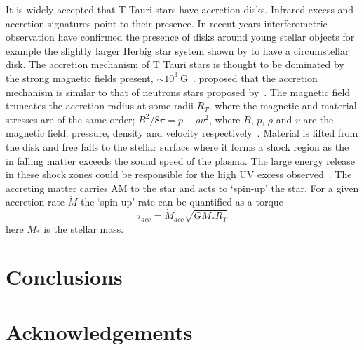 \documentclass[fleqn,usenatbib]{mnras}
\begin{document}
It is widely accepted that T Tauri stars have
accretion disks. Infrared excess and accretion
signatures point to their presence. In recent years
interferometric observation have confirmed the
presence of disks around young stellar objects for
example the slightly larger Herbig star system shown
by \cite{2012ApJ...752...11K} to have a circumstellar
disk. The accretion mechanism of T Tauri stars is
thought to be dominated by the strong magnetic fields
present, $\sim 10^{3}~\textrm{G}$~\citep{2012MNRAS.426.2901K}.
\citet{1991ApJ...370L..39K} proposed that the accretion mechanism is
similar to that of neutrons stars proposed
by~\citet{1977ApJ...217..578G}. The magnetic field truncates the
accretion radius at some radii $R_T$. where the magnetic and material
stresses are of the same order; $B^2/8\pi = p + \rho v^2$, where $B$,
$p$, $\rho$ and $v$ are the magnetic field, pressure, density and
velocity respectively~\citep{Romanova:2002hc}. Material is lifted from
the disk and free falls to the stellar surface where it forms a shock region as the in falling matter exceeds the sound speed of the plasma. The large energy release in these shock zones could be responsible for the high UV excess observed~\citep{2009A&A...508.1117Z}. The accreting matter carries AM to the star and acts to `spin-up' the star. For a given accretion rate $\dot{M}$ the `spin-up' rate can be quantified as a torque~\citep{2005ApJ...632L.135M}
\begin{equation}
    \tau_{acc} = \dot{M}_{acc}\sqrt{GM_{\ast}R_T}
    \label{eq:accretion_torque}
\end{equation}
here $M_{\ast}$ is the stellar mass.











\section{Conclusions}

\section*{Acknowledgements}




\end{document}
